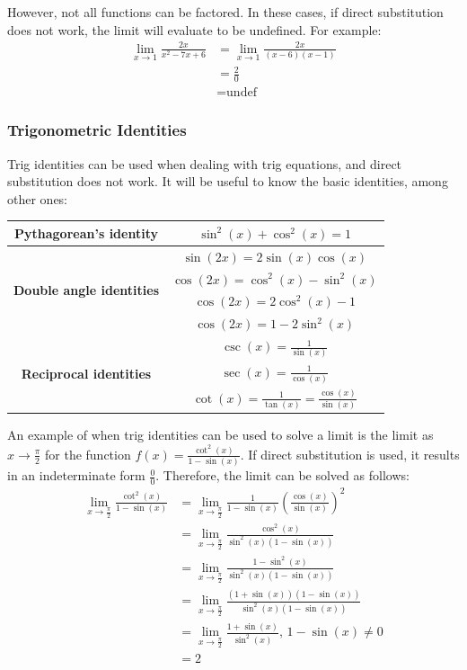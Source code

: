 \documentclass[12pt]{article}
\begin{document}
However, not all functions can be factored. In these cases, if direct substitution does not work, the limit will evaluate to be undefined. For example:
\begin{align*}
	\lim_{x \to 1} \frac{2x}{x^2 - 7x + 6} &= \lim_{x \to 1} \frac{2x}{(x-6)(x-1)} \\
	&= \frac{2}{0} \\
	&= \text{undef}
\end{align*}

\subsubsection{Trigonometric Identities}
Trig identities can be used when dealing with trig equations, and direct substitution does not work. It will be useful to know the basic identities, among other ones:
\begin{table}[H]
	\centering
	\begin{tabular}{|c|c|}
		\hline
		\textbf{Pythagorean's identity} & $\sin^2(x) + \cos^2(x) = 1$ \\
		\hline
		\multirow{4}{*}{\textbf{Double angle identities}} & $\sin(2x) = 2 \sin(x) \cos(x)$ \\
		& $\cos(2x) = \cos^2(x) - \sin^2(x)$ \\
		& $\cos(2x) = 2\cos^2(x) - 1$ \\
		& $\cos(2x) = 1 - 2\sin^2(x)$ \\
		\hline
		\multirow{3}{*}{\textbf{Reciprocal identities}} & $\csc(x) = \frac{1}{\sin(x)}$ \\[5pt]
		& $\sec(x) = \frac{1}{\cos(x)}$ \\[5pt]
		& $\cot(x) = \frac{1}{\tan(x)} = \frac{\cos(x)}{\sin(x)}$ \\[5pt]
		\hline
	\end{tabular}
\end{table}

An example of when trig identities can be used to solve a limit is the limit as $x \to \frac{\pi}{2}$ for the function $f(x) = \frac{\cot^2(x)}{1 - \sin(x)}$. If direct substitution is used, it results in an indeterminate form $\frac{0}{0}$. Therefore, the limit can be solved as follows:
\begin{align*}
	\lim_{x \to \frac{\pi}{2}} \frac{\cot^2(x)}{1 - \sin(x)} &= \lim_{x \to \frac{\pi}{2}} \frac{1}{1 - \sin(x)} \left( \frac{\cos(x)}{\sin(x)} \right)^2 \\[5pt]
	&= \lim_{x \to \frac{\pi}{2}} \frac{\cos^2(x)}{\sin^2(x) (1 - \sin(x))} \\[5pt]
	&= \lim_{x \to \frac{\pi}{2}} \frac{1 - \sin^2(x)}{\sin^2(x) (1 - \sin(x))} \\[5pt]
	&= \lim_{x \to \frac{\pi}{2}} \frac{(1 + \sin(x))(1 - \sin(x))}{\sin^2(x) (1 - \sin(x))} \\[5pt]
	&= \lim_{x \to \frac{\pi}{2}} \frac{1 + \sin(x)}{\sin^2(x)} , \, 1 - \sin(x) \ne 0 \\[5pt]
	&= 2
\end{align*}
\end{document}
